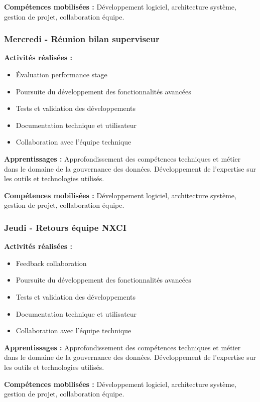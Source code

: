 \textbf{Compétences mobilisées :}
Développement logiciel, architecture système, gestion de projet, collaboration équipe.

\subsubsection{Mercredi - Réunion bilan superviseur}

\textbf{Activités réalisées :}
\begin{itemize}
    \item Évaluation performance stage
    \item Poursuite du développement des fonctionnalités avancées
    \item Tests et validation des développements
    \item Documentation technique et utilisateur
    \item Collaboration avec l'équipe technique
\end{itemize}

\textbf{Apprentissages :}
Approfondissement des compétences techniques et métier dans le domaine de la gouvernance des données. Développement de l'expertise sur les outils et technologies utilisés.

\textbf{Compétences mobilisées :}
Développement logiciel, architecture système, gestion de projet, collaboration équipe.

\subsubsection{Jeudi - Retours équipe NXCI}

\textbf{Activités réalisées :}
\begin{itemize}
    \item Feedback collaboration
    \item Poursuite du développement des fonctionnalités avancées
    \item Tests et validation des développements
    \item Documentation technique et utilisateur
    \item Collaboration avec l'équipe technique
\end{itemize}

\textbf{Apprentissages :}
Approfondissement des compétences techniques et métier dans le domaine de la gouvernance des données. Développement de l'expertise sur les outils et technologies utilisés.

\textbf{Compétences mobilisées :}
Développement logiciel, architecture système, gestion de projet, collaboration équipe.

